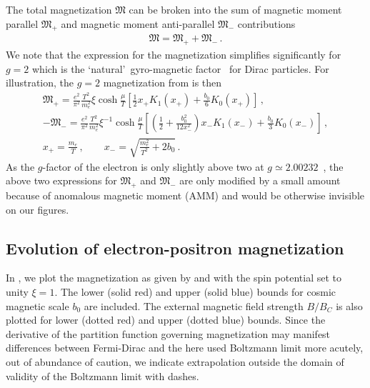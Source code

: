 The total magnetization ${\mathfrak M}$ can be broken into the sum of magnetic moment parallel ${\mathfrak M}_{+}$ and magnetic moment anti-parallel ${\mathfrak M}_{-}$ contributions
\begin{align}
\label{g2mag}
{\mathfrak M}={\mathfrak M}_{+}+{\mathfrak M}_{-}\,.
\end{align}
We note that the expression for the magnetization simplifies significantly for $g\!=\!2$ which is the \lq natural\rq\ gyro-magnetic factor~\citep{Evans:2022fsu,Rafelski:2022bsv} for Dirac particles. For illustration, the $g\!=\!2$ magnetization from  is then
\begin{gather}
 \label{g2magplus}
 {\mathfrak M}_{+}=\frac{e^{2}}{\pi^{2}}\frac{T^{2}}{m_{e}^{2}}\xi\cosh{\frac{\mu}{T}}\left[\frac{1}{2}x_{+}K_{1}(x_{+})+\frac{b_{0}}{6}K_{0}(x_{+})\right]\,,\\
 \label{g2magminus}
 -{\mathfrak M}_{-}=\frac{e^{2}}{\pi^{2}}\frac{T^{2}}{m_{e}^{2}}\xi^{-1}\cosh{\frac{\mu}{T}}
 \left[\left(\frac{1}{2}+\frac{b_{0}^{2}}{12x_{-}^{2}}\right)x_{-}K_{1}(x_{-})+\frac{b_{0}}{3}K_{0}(x_{-})\right]\,,\\
 x_{+}=\frac{m_{e}}{T}\,,\qquad
 x_{-}=\sqrt{\frac{m_{e}^{2}}{T^{2}}+2b_{0}}\,.
\end{gather}
As the $g$-factor of the electron is only slightly above two at $g\simeq2.00232$~\citep{Tiesinga:2021myr}, the above two expressions for ${\mathfrak M}_{+}$ and ${\mathfrak M}_{-}$ are only modified by a small amount because of anomalous magnetic moment (AMM) and would be otherwise invisible on our figures.

\subsection{Evolution of electron-positron magnetization}
\label{sec:paramagnetism}
\noindent In , we plot the magnetization as given by  and  with the spin potential set to unity $\xi=1$. The lower (solid red) and upper (solid blue) bounds for cosmic magnetic scale $b_{0}$ are included. The external magnetic field strength ${B}/{B}_{C}$ is also plotted for lower (dotted red) and upper (dotted blue) bounds. Since the derivative of the partition function governing magnetization may manifest differences between Fermi-Dirac and the here used Boltzmann limit more acutely, out of abundance of caution, we indicate extrapolation outside the domain of validity of the Boltzmann limit with dashes.

